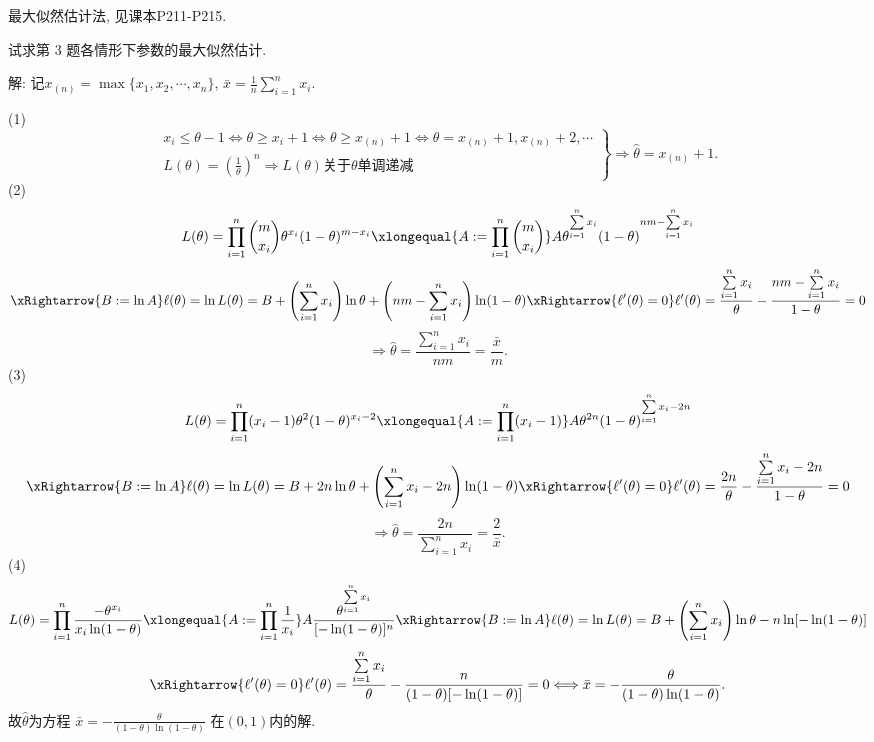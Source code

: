 \documentclass[standard]{ExBook}
\renewenvironment{shaded}{%
  \def\FrameCommand{\fboxsep=\FrameSep \colorbox{shadecolor}}%
  \MakeFramed{\advance\hsize-\width \FrameRestore}%
}{%
  \endMakeFramed
}
\begin{document}
\begin{qitems}
\textcolor{themeColor}{\selectfont {} 最大似然估计法, 见课本P211-P215.}

\vspace{2.5cm-5em}

    \begin{bbox}
    \begin{shaded}
        \qitem
试求第 3 题各情形下参数的最大似然估计.
    \end{shaded}
    \end{bbox}

\vspace{\dimexpr2.5cm-5em\relax}

解: 记$x_{(n)}=\max\{x_1,x_2,\cdots,x_n\}$, $\bar{x}=\frac{1}{n}\sum\limits_{i=1}^{n}x_i$.

(1)
$$
\left.
\begin{array}{r}
x_i \leq \theta-1
\Longleftrightarrow
\theta \geq x_i+1
\Longleftrightarrow
\theta \geq x_{(n)}+1
\Longleftrightarrow
\theta=x_{(n)}+1,x_{(n)}+2,\cdots\\
L(\theta)=\displaystyle\left(\frac{1}{\theta}\right)^n
\Longrightarrow
L(\theta)\text{关于}\theta\text{单调递减}
\end{array}
\right\}
\Longrightarrow
\hat{\theta}=x_{(n)}+1.
$$
(2)
$$
L(\theta)
=\prod_{i=1}^{n}{m\choose x_i}\theta^{x_i}(1-\theta)^{m-x_i}
\xlongequal{A:=\prod_{i=1}^{n}{m\choose x_i}}
A\theta^{\sum\limits_{i=1}^{n}x_i}(1-\theta)^{nm-\sum\limits_{i=1}^{n}x_i}
$$
$$
\xRightarrow{B:=\ln A}
\ell(\theta)
=\ln L(\theta)
=B+\left(\sum_{i=1}^{n}x_i\right)\ln\theta+
\left(nm-\sum\limits_{i=1}^{n}x_i\right)\ln(1-\theta)
\xRightarrow{\ell'(\theta)=0}
\ell'(\theta)
=\frac{\sum\limits_{i=1}^{n}x_i}{\theta}
-\frac{nm-\sum\limits_{i=1}^{n}x_i}{1-\theta}
=0
$$
$$
\Longrightarrow
\hat{\theta}=\frac{\sum\limits_{i=1}^{n}x_i}{nm}
=\frac{\bar{x}}{m}.
$$
(3)
$$
L(\theta)
=\prod_{i=1}^{n}(x_i-1)\theta^2(1-\theta)^{x_i-2}
\xlongequal{A:=\prod_{i=1}^{n}(x_i-1)}
A\theta^{2n}(1-\theta)^{\sum\limits_{i=1}^{n}x_i-2n}
$$
$$
\xRightarrow{B:=\ln A}
\ell(\theta)
=\ln L(\theta)
=B+2n\ln\theta+\left(\sum_{i=1}^{n}x_i-2n\right)\ln(1-\theta)
\xRightarrow{\ell'(\theta)=0}
\ell'(\theta)
=\frac{2n}{\theta}-\frac{\sum\limits_{i=1}^{n}x_i-2n}{1-\theta}=0
$$
$$
\Longrightarrow
\hat{\theta}=\frac{2n}{\sum\limits_{i=1}^{n}x_i}
=\frac{2}{\bar{x}}.
$$
(4)
$$
L(\theta)
=\prod_{i=1}^{n}\frac{-\theta^{x_i}}{x_i\ln(1-\theta)}
\xlongequal{A:=\prod_{i=1}^{n}\frac{1}{x_i}}
A\frac{\theta^{\sum\limits_{i=1}^{n}x_i}}{[-\ln(1-\theta)]^n}
\xRightarrow{B:=\ln A}
\ell(\theta)
=\ln L(\theta)
=B+\left(\sum_{i=1}^{n}x_i\right)\ln\theta
-n\ln[-\ln(1-\theta)]
$$
$$
\xRightarrow{\ell'(\theta)=0}
\ell'(\theta)
=\frac{\sum\limits_{i=1}^{n}x_i}{\theta}
-\frac{n}{(1-\theta)[-\ln(1-\theta)]}
=0
\Longleftrightarrow
\bar{x}=-\frac{\theta}{(1-\theta)\ln(1-\theta)}.
$$
故$\hat{\theta}$为方程
$
\bar{x}=-\frac{\theta}{(1-\theta)\ln(1-\theta)}
$
在$(0,1)$内的解.


\end{qitems}
\end{document}
